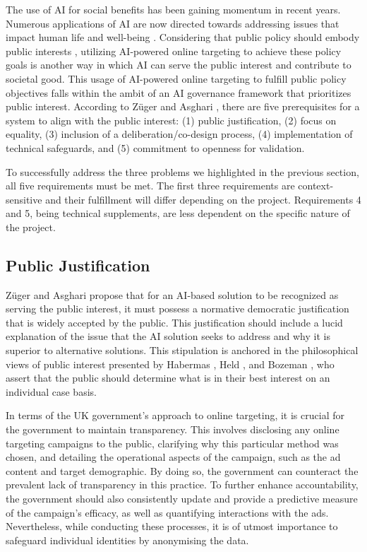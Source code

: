 \documentclass[preprint]{acmart}
\begin{document}
The use of AI for social benefits has been gaining momentum in recent years. Numerous applications of AI are now directed towards addressing issues that impact human life and well-being \cite{tomavsev2020ai,cowls2021definition}. Considering that public policy should embody public interests \cite{dejersey2003}, utilizing AI-powered online targeting to achieve these policy goals is another way in which AI can serve the public interest and contribute to societal good. This usage of AI-powered online targeting to fulfill public policy objectives falls within the ambit of an AI governance framework that prioritizes public interest. According to Züger and Asghari \cite{zuger2022}, there are five prerequisites for a system to align with the public interest: (1) public justification, (2) focus on equality, (3) inclusion of a deliberation/co-design process, (4) implementation of technical safeguards, and (5) commitment to openness for validation.


To successfully address the three problems we highlighted in the previous section, all five requirements must be met. The first three requirements are context-sensitive and their fulfillment will differ depending on the project. Requirements 4 and 5, being technical supplements, are less dependent on the specific nature of the project. 



\subsection{Public Justification}


Züger and Asghari \cite{zuger2022} propose that for an AI-based solution to be recognized as serving the public interest, it must possess a normative democratic justification that is widely accepted by the public. This justification should include a lucid explanation of the issue that the AI solution seeks to address and why it is superior to alternative solutions. This stipulation is anchored in the philosophical views of public interest presented by Habermas \cite{habermas2022neuer}, Held \cite{held1970}, and Bozeman \cite{bozeman2007}, who assert that the public should determine what is in their best interest on an individual case basis.

In terms of the UK government's approach to online targeting, it is crucial for the government to maintain transparency. This involves disclosing any online targeting campaigns to the public, clarifying why this particular method was chosen, and detailing the operational aspects of the campaign, such as the ad content and target demographic. By doing so, the government can counteract the prevalent lack of transparency in this practice. To further enhance accountability, the government should also consistently update and provide a predictive measure of the campaign's efficacy, as well as quantifying interactions with the ads. Nevertheless, while conducting these processes, it is of utmost importance to safeguard individual identities by anonymising the data.
\end{document}

